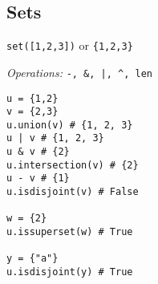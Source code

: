 \subsection{Sets}
\texttt{set([1,2,3])}  or \texttt{\{1,2,3\}}

\textit{Operations:} \texttt{-, \&, |, \textasciicircum, len}
\begin{lstlisting}
u = {1,2}
v = {2,3}
u.union(v) # {1, 2, 3}
u | v # {1, 2, 3}
u & v # {2}
u.intersection(v) # {2}
u - v # {1}
u.isdisjoint(v) # False

w = {2}
u.issuperset(w) # True

y = {"a"}
u.isdisjoint(y) # True
\end{lstlisting}
